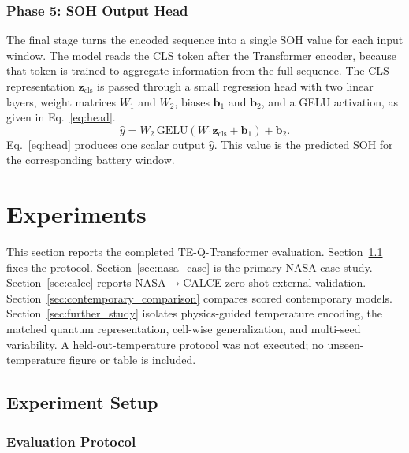 \documentclass[a4paper,fleqn]{cas-sc}
\begin{document}
\subsubsection{Phase 5: SOH Output Head}
The final stage turns the encoded sequence into a single SOH value for each input window. The model reads the CLS token after the Transformer encoder, because that token is trained to aggregate information from the full sequence. The CLS representation $\mathbf{z}_{\mathrm{cls}}$ is passed through a small regression head with two linear layers, weight matrices $W_{1}$ and $W_{2}$, biases $\mathbf{b}_{1}$ and $\mathbf{b}_{2}$, and a GELU activation, as given in Eq.~\eqref{eq:head}.
\begin{equation}
\hat{y}
=
W_{2}\,\mathrm{GELU}(W_{1}\mathbf{z}_{\mathrm{cls}}+\mathbf{b}_{1})+\mathbf{b}_{2}.
\label{eq:head}
\end{equation}
Eq.~\eqref{eq:head} produces one scalar output $\hat{y}$. This value is the predicted SOH for the corresponding battery window.




\section{Experiments}\label{sec:experiments}\label{sec:results}

This section reports the completed TE-Q-Transformer evaluation. Section~\ref{sec:experiment_setup} fixes the protocol. Section~\ref{sec:nasa_case} is the primary NASA case study. Section~\ref{sec:calce} reports NASA$\rightarrow$CALCE zero-shot external validation. Section~\ref{sec:contemporary_comparison} compares scored contemporary models. Section~\ref{sec:further_study} isolates physics-guided temperature encoding, the matched quantum representation, cell-wise generalization, and multi-seed variability. A held-out-temperature protocol was not executed; no unseen-temperature figure or table is included.

\subsection{Experiment Setup}
\label{sec:experiment_setup}

\subsubsection{Evaluation Protocol}
\label{sec:evaluation_protocol}
\end{document}
